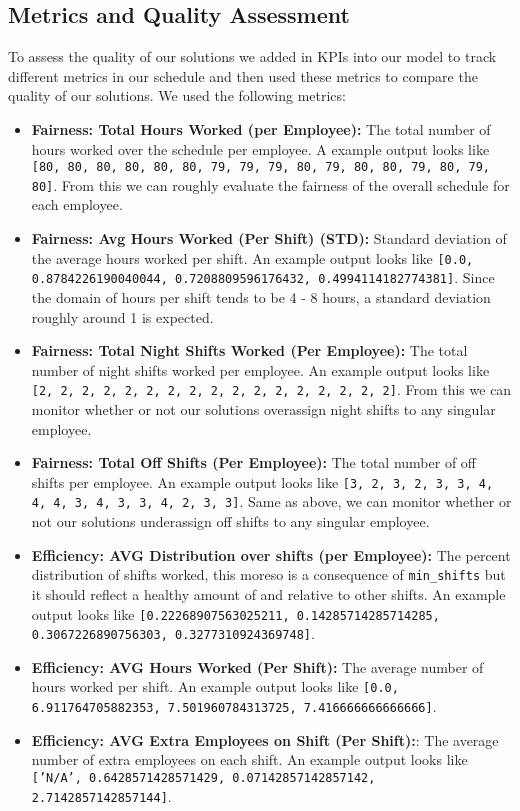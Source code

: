 \subsection*{Metrics and Quality Assessment}

To assess the quality of our solutions we added in KPIs into our model to track different metrics in our schedule 
and then used these metrics to compare the quality of our solutions. We used the following metrics:
\begin{itemize}
    \item \textbf{Fairness: Total Hours Worked (per Employee):} The total number of hours worked over the schedule per employee. A example output looks like \texttt{[80, 80, 80, 80, 80, 80, 79, 79, 79, 80, 79, 80, 80, 79, 80, 79, 80]}. From this we can roughly evaluate the fairness of the overall schedule for each employee. 
    \item \textbf{Fairness: Avg Hours Worked (Per Shift) (STD):} Standard deviation of the average hours worked per shift. An example output looks like \texttt{[0.0, 0.8784226190040044, 0.7208809596176432, 0.4994114182774381]}. Since the domain of hours per shift tends to be 4 - 8 hours, a standard deviation roughly around 1 is expected. 
    \item \textbf{Fairness: Total Night Shifts Worked (Per Employee):} The total number of night shifts worked per employee. An example output looks like \texttt{[2, 2, 2, 2, 2, 2, 2, 2, 2, 2, 2, 2, 2, 2, 2, 2, 2]}. From this we can monitor whether or not our solutions overassign night shifts to any singular employee. 
    \item \textbf{Fairness: Total Off Shifts (Per Employee):} The total number of off shifts per employee. An example output looks like \texttt{[3, 2, 3, 2, 3, 3, 4, 4, 4, 3, 4, 3, 3, 4, 2, 3, 3]}. Same as above, we can monitor whether or not our solutions underassign off shifts to any singular employee.
    \item \textbf{Efficiency: AVG Distribution over shifts (per Employee):} The percent distribution of shifts worked, this moreso is a consequence of \texttt{min\_shifts} but it should reflect a healthy amount of  and  relative to other shifts. An example output looks like \texttt{[0.22268907563025211, 0.14285714285714285, 0.3067226890756303, 0.3277310924369748]}.
    \item \textbf{Efficiency: AVG Hours Worked (Per Shift):} The average number of hours worked per shift. An example output looks like \texttt{[0.0, 6.911764705882353, 7.501960784313725, 7.416666666666666]}.
    \item \textbf{Efficiency: AVG Extra Employees on Shift (Per Shift):}: The average number of extra employees on each shift. An example output looks like \texttt{['N/A', 0.6428571428571429, 0.07142857142857142, 2.7142857142857144]}.
\end{itemize}

